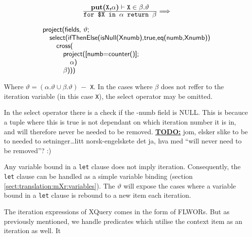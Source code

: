\begin{equation}
\centering
\begin{array}{c}
	\frac{\displaystyle \textbf{put(}\texttt{X}\textbf{,}\alpha\textbf{)}\vdash\texttt{X}\in\beta . \vartheta}
	{\displaystyle \texttt{for \$X in }\alpha	\texttt{ return }\beta}
	
	\Longrightarrow 
	\\
	\mbox{} \\
	
	\begin{array}{l}
	\mbox{\textsf{project(fields, }} \vartheta \mbox{\textsf{;}} \\ \quad
	\mbox{\textsf{select(ifThenElse(isNull(Xnumb),true,eq(numb,Xnumb))}} \\ \quad \quad 
	\mbox{\textsf{cross(}} \\ \quad \quad \quad
	\mbox{\textsf{project([numb=counter()];}} \\ \quad \quad \quad \quad
	\alpha \mbox{\textsf{)}} \\ \quad \quad \quad 
	\beta \mbox{\textsf{)))}}
	\end{array}
\end{array}
\label{eq:translation:simpleIteration}
\end{equation}

Where $\vartheta = (\alpha.\vartheta \cup \beta.\vartheta)\, -$ \texttt{X}. In the cases where $\beta$ does not
reffer to the iteration variable (in this case \texttt{X}), the \textsf{select} operator may be omitted.

In the \textsf{select} operator there is a check if the \textsf{-numb} field is \textsf{NULL}. This is becauce a
tuple where this is true is not dependant on which iteration number it is in, and will therefore never be needed
to be removed. \underline{\textbf{\Large TODO:}} jom, elsker slike to be to
needed to setninger\ldots litt norsk-engelskete det ja, hva med ``will never
need to be removed''? :)

Any variable bound in a \texttt{let} clause does not imply iteration. Consequently, the \texttt{let} clause can be
handled as a simple variable binding (section \ref{sect:translation:mXr:variables}). The $\vartheta$ will expose
the cases where a variable bound in a \texttt{let} clause is rebound to a new item each iteration.





The iteration expressions of XQuery comes in the form of FLWORs. But as
previously mentioned, we handle predicates which utilise the context item as an
iteration as well. It 


